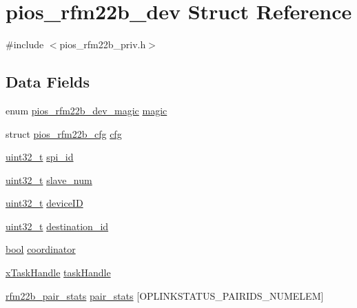 \hypertarget{structpios__rfm22b__dev}{\section{pios\-\_\-rfm22b\-\_\-dev Struct Reference}
\label{structpios__rfm22b__dev}
}


{\ttfamily \#include $<$pios\-\_\-rfm22b\-\_\-priv.\-h$>$}

\subsection*{Data Fields}
\begin{DoxyCompactItemize}
\item 
enum \hyperlink{group___p_i_o_s___r_f_m22_b_ga25f646fb6abded1e9f076ca00e13cbec}{pios\-\_\-rfm22b\-\_\-dev\-\_\-magic} \hyperlink{structpios__rfm22b__dev_acffebca4153749f86cd6237ac4482f3a}{magic}
\item 
struct \hyperlink{structpios__rfm22b__cfg}{pios\-\_\-rfm22b\-\_\-cfg} \hyperlink{structpios__rfm22b__dev_a2fc3047fbb17be7e546cab4e24ee2b28}{cfg}
\item 
\hyperlink{stdint_8h_a435d1572bf3f880d55459d9805097f62}{uint32\-\_\-t} \hyperlink{structpios__rfm22b__dev_a7fae761882f21a9a0088db1f81dd41da}{spi\-\_\-id}
\item 
\hyperlink{stdint_8h_a435d1572bf3f880d55459d9805097f62}{uint32\-\_\-t} \hyperlink{structpios__rfm22b__dev_a4e0db01351dfac40720073969a7fafae}{slave\-\_\-num}
\item 
\hyperlink{stdint_8h_a435d1572bf3f880d55459d9805097f62}{uint32\-\_\-t} \hyperlink{structpios__rfm22b__dev_ac608ccb62cbd144c8053aaacb8c14fcf}{device\-I\-D}
\item 
\hyperlink{stdint_8h_a435d1572bf3f880d55459d9805097f62}{uint32\-\_\-t} \hyperlink{structpios__rfm22b__dev_ada47e039e7ba782c44b154fce01005eb}{destination\-\_\-id}
\item 
\hyperlink{group___exported__types_gaf6a258d8f3ee5206d682d799316314b1}{bool} \hyperlink{structpios__rfm22b__dev_a37c2eab9f05656b3ef5690689b0e06c9}{coordinator}
\item 
\hyperlink{_common_2_libraries_2_free_r_t_o_s_2_source_2include_2task_8h_a271ae40d5db07d928a113766505a0965}{x\-Task\-Handle} \hyperlink{structpios__rfm22b__dev_a28c619aaf7379eacea11f08847223cc2}{task\-Handle}
\item 
\hyperlink{structrfm22b__pair__stats}{rfm22b\-\_\-pair\-\_\-stats} \hyperlink{structpios__rfm22b__dev_a6db8d809d116a414eb5c7a826c833bc5}{pair\-\_\-stats} \mbox{[}O\-P\-L\-I\-N\-K\-S\-T\-A\-T\-U\-S\-\_\-\-P\-A\-I\-R\-I\-D\-S\-\_\-\-N\-U\-M\-E\-L\-E\-M\mbox{]}

\end{DoxyCompactItemize}
